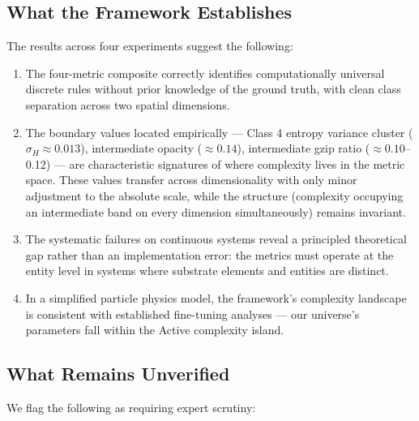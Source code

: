 \documentclass[12pt,a4paper]{article}
\begin{document}
\subsection{What the Framework Establishes}

The results across four experiments suggest the following:

\begin{enumerate}[noitemsep]
  \item The four-metric composite correctly identifies computationally
    universal discrete rules without prior knowledge of the ground truth,
    with clean class separation across two spatial dimensions.
  \item The boundary values located empirically — Class 4 entropy variance
    cluster ($\sigma_H \approx 0.013$), intermediate opacity ($\approx 0.14$),
    intermediate gzip ratio ($\approx 0.10$--0.12) — are characteristic
    signatures of where complexity lives in the metric space.
    These values transfer across dimensionality with only minor adjustment
    to the absolute scale, while the structure (complexity occupying an
    intermediate band on every dimension simultaneously) remains invariant.
  \item The systematic failures on continuous systems reveal a principled
    theoretical gap rather than an implementation error: the metrics
    must operate at the entity level in systems where substrate elements
    and entities are distinct.
  \item In a simplified particle physics model, the framework's
    complexity landscape is consistent with established fine-tuning
    analyses \citep{adams2019} — our universe's parameters fall within
    the Active complexity island.
\end{enumerate}

\subsection{What Remains Unverified}

We flag the following as requiring expert scrutiny:
\end{document}
